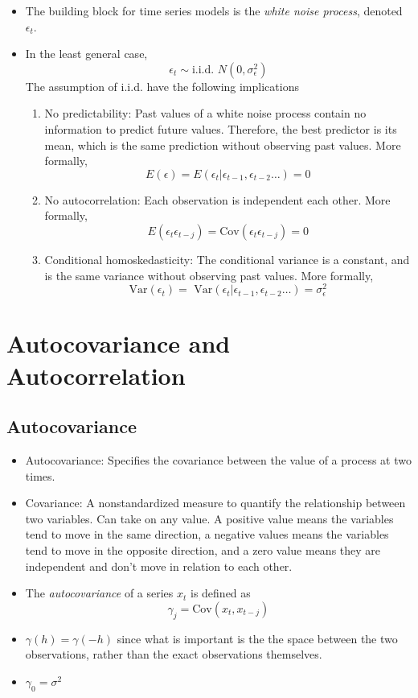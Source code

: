 \documentclass[11pt]{article}
\begin{document}
\begin{itemize}
    \item The building block for time series models is the \textit{white noise process}, 
    denoted $\epsilon_t$.
    \item In the least general case,
    \[ \epsilon_t \sim \text{i.i.d. } N(0, \sigma_{\epsilon}^{2})\]
    The assumption of i.i.d. have the following implications 
    \begin{enumerate}
        \item No predictability: Past values of a white noise process contain no information to predict future 
        values. Therefore, the best predictor is its mean, which is the same prediction without 
        observing past values. More formally, 
        \[E(\epsilon) = E(\epsilon_t | \epsilon_{t-1}, \epsilon_{t-2} \ldots) = 0\]
        \item No autocorrelation: Each observation is independent each other. More formally, 
        \[E(\epsilon_t \epsilon_{t-j}) = \text{Cov}(\epsilon_t \epsilon_{t-j})=0\]
        \item Conditional homoskedasticity: The conditional variance is a constant, and is 
        the same variance without observing past values. More formally, 
        \[\text{Var}(\epsilon_t) = \text{ Var}(\epsilon_t | \epsilon_{t-1}, \epsilon_{t-2} 
        \ldots) = \sigma_{\epsilon}^{2}\]
    \end{enumerate}
\end{itemize}

\section{Autocovariance and Autocorrelation}
\subsection{Autocovariance}
\begin{itemize}
    \item Autocovariance: Specifies the covariance between the value of a process at two times.
    \item Covariance: A nonstandardized measure to quantify the relationship between two 
    variables. Can take on any value. A positive value means the variables tend to move in the 
    same direction, a negative values means the variables tend to move in the opposite 
    direction, and a zero value means they are independent and don't move in relation to each 
    other.
    \item The \textit{autocovariance} of a series $x_t$ is defined as 
    \[\gamma_j = \text{Cov}(x_t, x_{t-j})\]
    \item $\gamma(h) = \gamma(-h)$ since what is important is the the space between the two 
    observations, rather than the exact observations themselves. 
    \item $\gamma_0 = \sigma^2$
\end{itemize}
\end{document}

